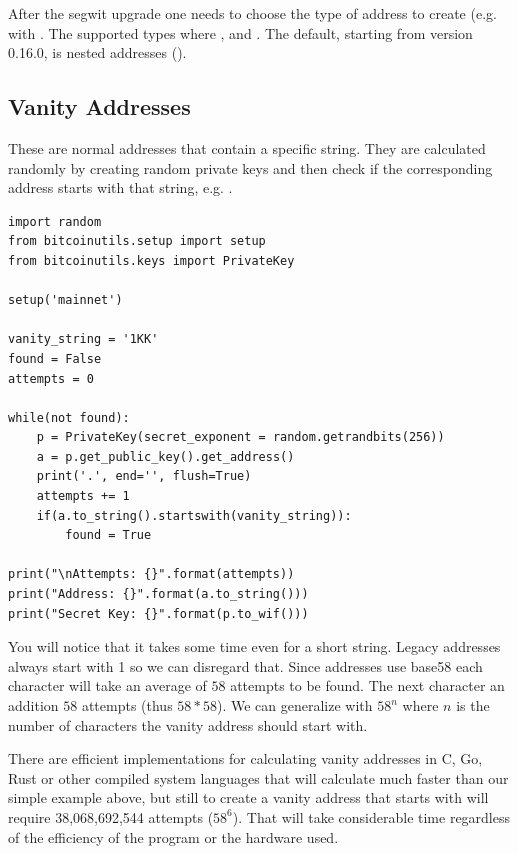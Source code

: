 \begin{note}
After the segwit upgrade one needs to choose the type of address to create (e.g. with . The supported types where ,  and . The default, starting from version 0.16.0, is nested addresses ().
\end{note}


\subsection*{Vanity Addresses}
These are normal addresses that contain a specific string. They are calculated randomly by creating random private keys and then check if the corresponding address starts with that string, e.g. .

\vspace{1em}
\begin{lstlisting}[style=Python,label={lst:vanity-address-example},caption={Example of creating a vanity address using Python},captionpos=b]
import random
from bitcoinutils.setup import setup
from bitcoinutils.keys import PrivateKey

setup('mainnet')

vanity_string = '1KK'
found = False
attempts = 0

while(not found):
    p = PrivateKey(secret_exponent = random.getrandbits(256))
    a = p.get_public_key().get_address()
    print('.', end='', flush=True)
    attempts += 1
    if(a.to_string().startswith(vanity_string)):
        found = True

print("\nAttempts: {}".format(attempts))
print("Address: {}".format(a.to_string()))
print("Secret Key: {}".format(p.to_wif()))
\end{lstlisting}
\vspace{1em}

You will notice that it takes some time even for a short string. Legacy addresses always start with 1 so we can disregard that. Since addresses use base58 each character will take an average of $58$ attempts to be found. The next character an addition $58$ attempts (thus $58*58$). We can generalize with $58^{n}$ where $n$ is the number of characters the vanity address should start with. 

There are efficient implementations for calculating vanity addresses in C, Go, Rust or other compiled system languages that will calculate much faster than our simple example above, but still to create a vanity address that starts with  will require 38,068,692,544 attempts ($58^{6}$). That will take considerable time regardless of the efficiency of the program or the hardware used.

